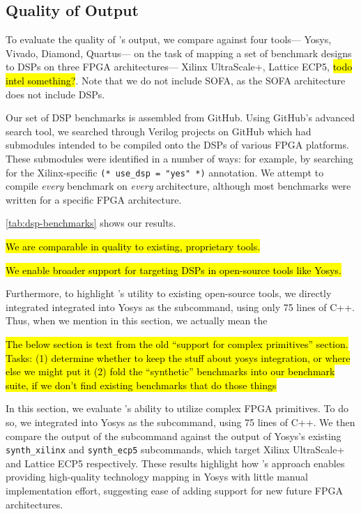 \subsection{Quality of Output}
To evaluate the quality of \lr's output,
  we compare \lr against four tools---%
  Yosys,
  Vivado,
  Diamond,
  Quartus---%
  on the task of mapping
  a set of benchmark designs
  to DSPs
  on three FPGA architectures---%
  Xilinx UltraScale+,
  Lattice ECP5,
  \hl{todo intel something?}.
Note that we do not include
  SOFA,
  as the SOFA architecture
  does not include DSPs.

Our set of DSP benchmarks
  is assembled from GitHub.
Using GitHub's advanced search tool,
  we searched through Verilog projects
  on GitHub
  which had submodules
  intended to be compiled onto
  the DSPs of various FPGA platforms.
These submodules were identified
  in a number of ways:
  for example, by searching for
  the Xilinx-specific
  \texttt{(* use\_dsp = "yes" *)}
  annotation.
We attempt to compile \textit{every}
  benchmark
  on \textit{every}
  architecture,
  although most benchmarks
  were written
  for a specific FPGA architecture.

\cref{tab:dsp-benchmarks}
  shows our results.
  
\hl{We are comparable in quality to
  existing, proprietary tools.}

\hl{We enable broader support
  for targeting DSPs
  in open-source tools like Yosys.}




  
Furthermore, to highlight \lr's
  utility to existing open-source tools,
  we directly integrated 
  integrated \lr 
  into Yosys
  as the 
  \texttt{\lowercaselr}
  subcommand,
  using only 75 lines
  of C++.
Thus, when we mention
  \lr in this section,
  we actually mean
  the
  \texttt{\lowercaselr}

\hl{The below section is  text from the old
``support for complex primitives'' section.
Tasks: (1) determine whether to keep
the stuff about yosys integration,
or where else we might put it
(2) fold the ``synthetic'' benchmarks 
into our benchmark suite, if we don't find
existing benchmarks that do those things
}


In this section,
  we evaluate \lr's ability
  to utilize complex FPGA primitives.
To do so,
  we integrated \lr 
  into Yosys
  as the 
  \texttt{\lowercaselr}
  subcommand,
  using 75 lines
  of C++.
We then compare 
  the output of the 
  \texttt{\lowercaselr}
  subcommand
  against the output of
  Yosys's existing
  \texttt{synth\_xilinx}
  and
  \texttt{synth\_ecp5}
  subcommands,
  which target Xilinx UltraScale+
  and Lattice ECP5
  respectively.
These results highlight how \lr's approach
  enables providing high-quality technology mapping
  in Yosys with little manual implementation effort,
  suggesting ease of adding support for new
  future FPGA architectures.

